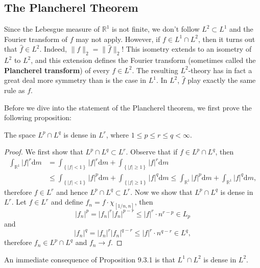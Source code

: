 \subsection{The Plancherel Theorem}
Since the Lebesgue measure of $\mathbb{R}^1$ is not finite, we don't follow $L^2\subset L^1$ and the Fourier transform of $f$ may not apply. However, if $f\in L^1\cap L^2$, then it turns out that $\widehat{f}\in L^2$. Indeed, $\|f\|_2=\|\widehat{f}\|_2$! This isometry extends to an isometry of $L^2$ to $L^2$, and this extension defines the Fourier transform (sometimes called the \textbf{Plancherel transform}) of every $f\in L^2$. The resulting $L^2$-theory has in fact a great deal more symmetry than is the case in $L^1$. In $L^2$, $\widehat{f}$ play exactly the same rule as $f$.\par
Before we dive into the statement of the Plancherel theorem, we first prove the following proposition:
\begin{proposition}
The space $L^p\cap L^q$ is dense in $L^r$, where $1\le p\le r\le q<\infty$.
\end{proposition}
\begin{proof}
We first show that $L^p\cap L^q\subset L^r$. Observe that if $f\in L^p\cap L^q$, then 
$$
\begin{aligned}
\int_{\mathbb{R} ^1}{\left| f \right|^r\mathrm{d}m}&=\int_{\left\{ \left| f \right|<1 \right\}}{\left| f \right|^r\mathrm{d}m}+\int_{\left\{ \left| f \right|\ge 1 \right\}}{\left| f \right|^r\mathrm{d}m}
\\
&\le \int_{\left\{ \left| f \right|<1 \right\}}{\left| f \right|^p\mathrm{d}m}+\int_{\left\{ \left| f \right|\ge 1 \right\}}{\left| f \right|^q\mathrm{d}m}\le \int_{\mathbb{R} ^1}{\left| f \right|^p\mathrm{d}m}+\int_{\mathbb{R} ^1}{\left| f \right|^q\mathrm{d}m},
\end{aligned}
$$
therefore $f\in L^r$ and hence $L^p\cap L^q\subset L^r$. Now we show that $L^p\cap L^q$ is dense in $L^r$. Let $f\in L^r$ and define $f_n=f\cdot\chi_{[1/n,n]}$, then 
$$
\left| f_n \right|^p=\left| f_n \right|^r\left| f_n \right|^{p-r}\le \left| f \right|^r\cdot n^{r-p}\in L_p
$$
and 
$$
\left| f_n \right|^q=\left| f_n \right|^r\left| f_n \right|^{q-r}\le \left| f \right|^r\cdot n^{q-r}\in L^q,
$$
therefore $f_n\in L^p\cap L^q$ and $f_n\to f$.
\end{proof}
An immediate consequence of Proposition 9.3.1 is that $L^1\cap L^2$ is dense in $L^2$.
